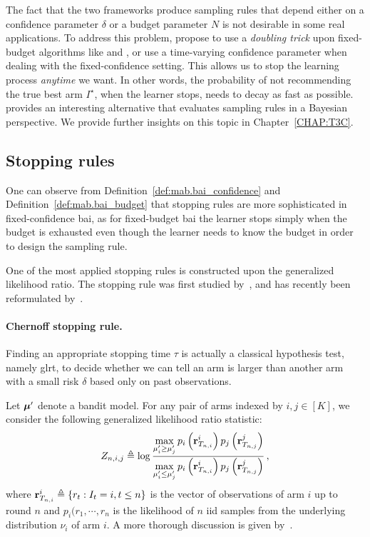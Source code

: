 The fact that the two frameworks produce sampling rules that depend either on a confidence parameter $\delta$ or a budget parameter $N$ is not desirable in some real applications. To address this problem, \cite{jun2016atlucb} propose to use a \emph{doubling trick} upon fixed-budget algorithms like \SR and \SHA, or use a time-varying confidence parameter when dealing with the fixed-confidence setting. This allows us to stop the learning process \emph{anytime} we want. In other words, the probability of not recommending the true best arm $I^\star$, when the learner stops, needs to decay as fast as possible. \cite{russo2016ttts} provides an interesting alternative that evaluates sampling rules in a Bayesian perspective. We provide further insights on this topic in Chapter~\ref{CHAP:T3C}. %

\subsection{Stopping rules}\label{sec:mab.bai.stopping}

One can observe from Definition~\ref{def:mab.bai_confidence} and Definition~\ref{def:mab.bai_budget} that stopping rules are more sophisticated in fixed-confidence \gls{bai}, as for fixed-budget \gls{bai} the learner stops simply when the budget is exhausted even though the learner needs to know the budget in order to design the sampling rule.

One of the most applied stopping rules is constructed upon the \gls{generalized likelihood ratio}. The stopping rule was first studied by~\cite{chernoff1959}, and has recently been reformulated by~\cite{garivier2016tracknstop}.

\paragraph{Chernoff stopping rule.}
Finding an appropriate stopping time $\tau$ is actually a classical hypothesis test, namely \gls{glrt}, to decide whether we can tell an arm is larger than another arm with a small risk $\delta$ based only on past observations.

Let ${\boldsymbol \mu}'$ denote a bandit model. For any pair of arms indexed by $i, j \in [K]$, we consider the following generalized likelihood ratio statistic:
\[
    Z_{n,i,j} \triangleq \log\frac{\displaystyle \max_{\mu'_i\geq\mu'_j} p_i\left({\bf r}_{T_{n,i}}^i\right)p_j\left({\bf r}_{T_{n,j}}^j\right)}{\displaystyle \max_{\mu'_i\leq\mu'_j} p_i\left({\bf r}_{T_{n,i}}^i\right)p_j\left({\bf r}_{T_{n,j}}^j\right)}\,,
\]
where ${\bf r}_{T_{n,i}}^i\triangleq\{r_t:I_t=i,t\leq n\}$ is the vector of observations of arm $i$ up to round $n$ and $p_i(r_1,\cdots,r_n$ is the likelihood of $n$ \gls{iid} samples from the underlying distribution $\nu_i$ of arm $i$. A more thorough discussion is given by~\cite{kaufmann2017survey}.

